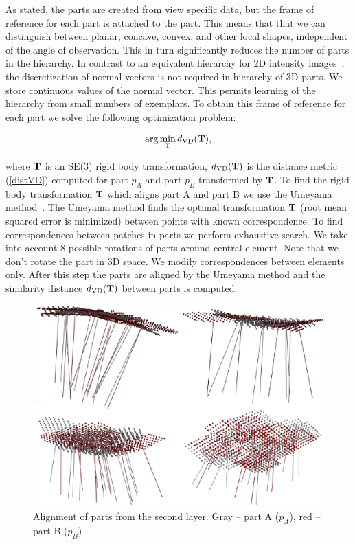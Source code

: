 \documentclass[letterpaper,10pt,conference]{ieeeconf}  %
\begin{document}
As stated, the parts are created from view specific data, but the frame of reference for each part is attached to the part. This means that that we can distinguish between planar, concave, convex, and other local shapes, independent of the angle of observation. This in turn significantly reduces the number of parts in the hierarchy. In contrast to an equivalent hierarchy for 2D intensity images~\cite{Fiedler2014}, the discretization of normal vectors is not required in hierarchy of 3D parts. We store continuous values of the normal vector. This permits learning of the hierarchy from small numbers of exemplars. To obtain this frame of reference for each part we solve the following optimization problem:

\begin{equation}
\label{optVI}
 \arg\min_{\bf T} d_{\rm VD}({\bf T}),
\end{equation}

where ${\bf T}$ is an SE(3) rigid body transformation, $d_{\rm VD}({\bf T})$ is the distance metric (\ref{distVD}) computed for part $p_A$ and part $p_B$ transformed by ${\bf T}$. To find the rigid body transformation ${\bf T}$ which aligns part A and part B we use the Umeyama method~\cite{Umeyama1991}. The Umeyama method finds the optimal transformation ${\bf T}$ (root mean squared error is minimized) between points with known correspondence. To find correspondences between patches in parts we perform exhaustive search. We take into account 8 possible rotations of parts around central element. Note that we don't rotate the part in 3D space. We modify correspondences between elements only. After this step the parts are aligned by the Umeyama method and the similarity distance $d_{\rm VD}({\bf T})$ between parts is computed. 

\begin{figure}[t]
 \centering
 \includegraphics[width=0.95\columnwidth]{../images/parts2ndLayer.eps}
 \caption{Alignment of parts from the second layer. Gray -- part A ($p_A$), red -- part B ($p_B$)}
 \label{parts2ndLayer}
\end{figure}
\end{document}
